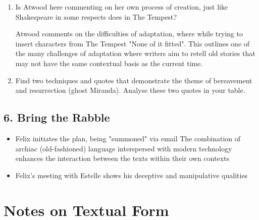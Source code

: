 			\begin{enumerate}
				\item Is Atwood here commenting on her own process of creation, just like Shakespeare in some respects does in The Tempest?

					Atwood comments on the difficulties of adaptation, where while trying to insert characters from The Tempest "None of it fitted". This outlines one of the many challenges of adaptation where writers aim to retell old stories that may not have the same contextual basis as the current time.
				\item Find two techniques and quotes that demonstrate the theme of bereavement and resurrection (ghost Miranda). Analyse these two quotes in your table.

			\end{enumerate}

	\subsection{6. Bring the Rabble}
	
		\begin{itemize}
			\item Felix initiates the plan, being "summoned" via email
				\subitem The combination of archiac (old-fashioned) language interspersed with modern technology enhances the interaction between the texts within their own contexts
			\item Felix's meeting with Estelle shows his deceptive and manipulative qualities
		\end{itemize}
\section{Notes on Textual Form}

